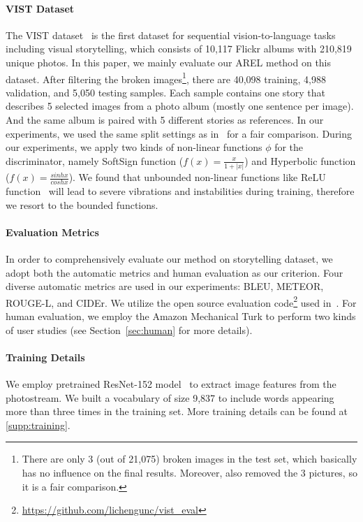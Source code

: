 \documentclass[11pt,a4paper]{article}
\begin{document}
\paragraph{VIST Dataset} The VIST dataset~\cite{huang2016visual} is the first dataset for sequential vision-to-language tasks including visual storytelling, which consists of 10,117 Flickr albums with 210,819 unique photos. In this paper, we mainly evaluate our AREL method on this dataset. After filtering the broken images\footnote{There are only 3 (out of 21,075) broken images in the test set, which basically has no influence on the final results. Moreover, \citet{yu-bansal-berg:2017:EMNLP2017} also removed the 3 pictures, so it is a fair comparison.}, there are 40,098 training, 4,988 validation, and 5,050 testing samples. 
Each sample contains one story that describes 5 selected images from a photo album (mostly one sentence per image). And the same album is paired with 5 different stories as references. In our experiments, we used the same split settings as in~\cite{huang2016visual,yu-bansal-berg:2017:EMNLP2017} for a fair comparison. During our experiments, we apply two kinds of non-linear functions $\phi$ for the discriminator, namely SoftSign function ($f(x)=\frac{x}{1+|x|}$) and Hyperbolic function  ($f(x)=\frac{sinh x}{cosh x}$). We found that unbounded non-linear functions like ReLU function~\cite{glorot2011deep} will lead to severe vibrations and instabilities during training, therefore we resort to the bounded functions.

\paragraph{Evaluation Metrics}
In order to comprehensively evaluate our method on storytelling dataset, we adopt both the automatic metrics and human evaluation as our criterion. Four diverse automatic metrics are used in our experiments: BLEU, METEOR, ROUGE-L, and CIDEr. We utilize the open source evaluation code\footnote{\scriptsize\url{https://github.com/lichengunc/vist_eval}} used in~\cite{yu-bansal-berg:2017:EMNLP2017}. For human evaluation, we employ the Amazon Mechanical Turk to perform two kinds of user studies (see Section~\ref{sec:human} for more details). 

\paragraph{Training Details}
We employ pretrained ResNet-152 model~\cite{he2016deep} to extract image features from the photostream. We built a vocabulary of size 9,837 to include words appearing more than three times in the training set. More training details can be found at \autoref{supp:training}. 
\end{document}

